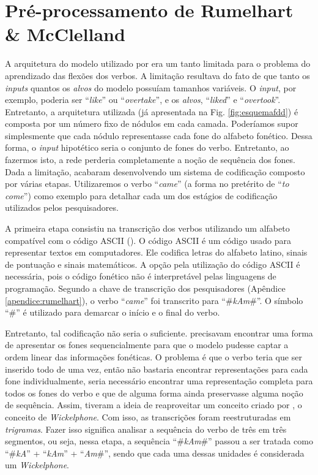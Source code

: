 \section{Pré-processamento de Rumelhart \& McClelland}
\label{sec:transcr}
A arquitetura do modelo utilizado por \cite{rumelhart:1986} era um tanto limitada para o problema do aprendizado das flexões dos verbos. A limitação resultava do fato de que tanto os \textit{inputs} quantos os \textit{alvos} do modelo possuíam tamanhos variáveis. O \textit{input}, por exemplo, poderia ser “\textit{like}” ou “\textit{overtake}”, e os \textit{alvos}, “\textit{liked}” e “\textit{overtook}”. Entretanto, a arquitetura utilizada (já apresentada na Fig. \ref{fig:esquemafdd}) é composta por um número fixo de nódulos em cada camada. Poderíamos supor simplesmente que cada nódulo representasse cada fone do alfabeto fonético. Dessa forma, o \textit{input} hipotético seria o conjunto de fones do verbo. Entretanto, ao fazermos isto, a rede perderia completamente a noção de sequência dos fones. Dada a limitação, \cite{rumelhart:1986} acabaram desenvolvendo um sistema de codificação composto por várias etapas. Utilizaremos o verbo “\textit{came}” (a forma no pretérito de “\textit{to come}”) como exemplo para detalhar cada um dos estágios de codificação utilizados pelos pesquisadores.

A primeira etapa consistiu na transcrição dos verbos utilizando um alfabeto compatível com o código ASCII (\cite{mackenzie1980coded}). O código ASCII é um código 
usado para representar textos em computadores. Ele codifica letras do alfabeto latino, sinais de pontuação e sinais matemáticos. A opção pela utilização do código ASCII é necessária, pois o código fonético não é interpretável pelas linguagens de programação. Segundo a chave de transcrição dos pesquisadores (Apêndice \ref{apendice:rumelhart}), o verbo “\textit{came}” foi transcrito para “\#\textit{kAm}\#”. O símbolo “\#” é utilizado para demarcar o início e o final do verbo. 

Entretanto, tal codificação não seria o suficiente. \cite{rumelhart:1986} precisavam encontrar uma forma de apresentar os fones sequencialmente para que o modelo pudesse captar a ordem linear das informações fonéticas. O problema é que o verbo teria que ser inserido todo de uma vez, então não bastaria encontrar representações para cada fone individualmente, seria necessário encontrar uma representação completa para todos os fones do verbo e que de alguma forma ainda preservasse alguma noção de sequência. 
Assim, \cite{rumelhart:1986} tiveram a ideia de reaproveitar um conceito criado por \cite{wickelgren:1969}, o conceito de \textit{Wickelphone}. Com isso, as transcrições foram reestruturadas em \textit{trigramas}. Fazer isso significa analisar a sequência do verbo de três em três segmentos, ou seja, nessa etapa, a sequência “\#\textit{kAm}\#” passou a ser tratada como “\#\textit{kA}” + “\textit{kAm}” + “\textit{Am}\#”, sendo que cada uma dessas unidades é considerada um \textit{Wickelphone}. 

